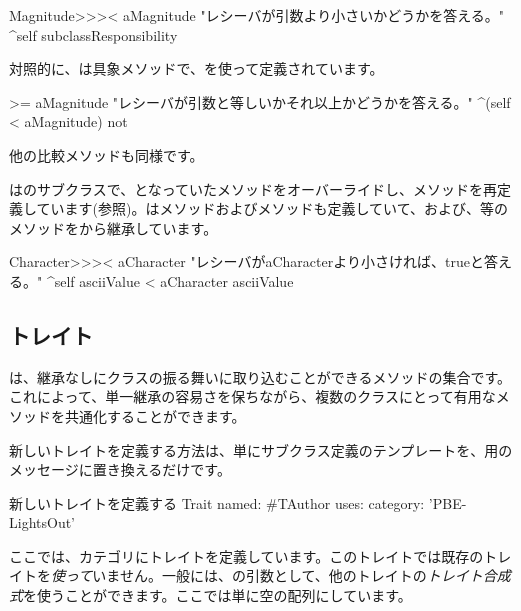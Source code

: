 \documentclass[a4paper,10pt,twoside]{book}
\begin{document}
\begin{method}[MagnitudeLessThan]{}
Magnitude>>>< aMagnitude 
	"レシーバが引数より小さいかどうかを答える。"
	^self subclassResponsibility
\end{method}

\noindent
対照的に、は具象メソッドで、\ct{<}を使って定義されています。

\begin{method}[Magnitude>=]{}
>= aMagnitude 
	"レシーバが引数と等しいかそれ以上かどうかを答える。"
	^(self < aMagnitude) not
\end{method}
他の比較メソッドも同様です。

はのサブクラスで、となっていた\ct{<}メソッドをオーバーライドし、メソッドを再定義しています(参照)。は\ct{=}メソッドおよびメソッドも定義していて、\ct{>=}および\ct{<=}、\ct{~=}等のメソッドをから継承しています。

\begin{method}[CharacterLessThan]{}
Character>>>< aCharacter 
	"レシーバがaCharacterより小さければ、trueと答える。"
	^self asciiValue < aCharacter asciiValue
\end{method}

\subsection{トレイト}
は、継承なしにクラスの振る舞いに取り込むことができるメソッドの集合です。これによって、単一継承の容易さを保ちながら、複数のクラスにとって有用なメソッドを共通化することができます。

新しいトレイトを定義する方法は、単にサブクラス定義のテンプレートを、用のメッセージに置き換えるだけです。

\begin{classdef}[tauthor]{新しいトレイトを定義する}
Trait named: #TAuthor
	uses: { }
	category: 'PBE-LightsOut'
\end{classdef}

\noindent
ここでは、カテゴリにトレイトを定義しています。このトレイトでは既存のトレイトを\emph{使って}いません。一般には、の引数として、他のトレイトの\emph{トレイト合成式}を使うことができます。ここでは単に空の配列にしています。
\end{document}
